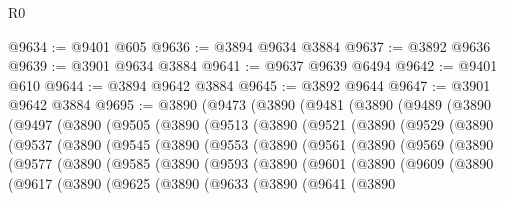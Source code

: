 \begin{lexlean}{R0}
\begin{coremodule}
@9634 := @9401 @605
@9636 := @3894 @9634 @3884
@9637 := @3892 @9636
@9639 := @3901 @9634 @3884
@9641 := @9637 @9639 @6494
@9642 := @9401 @610
@9644 := @3894 @9642 @3884
@9645 := @3892 @9644
@9647 := @3901 @9642 @3884
@9695 := @3890
    (@9473
      (@3890
        (@9481
          (@3890
            (@9489
              (@3890
                (@9497
                  (@3890
                    (@9505
                      (@3890
                        (@9513
                          (@3890
                            (@9521
                              (@3890
                                (@9529
                                  (@3890
                                    (@9537
                                      (@3890
                                        (@9545
                                          (@3890
                                            (@9553
                                              (@3890
                                                (@9561
                                                  (@3890
                                                    (@9569
                                                      (@3890
                                                        (@9577
                                                          (@3890
                                                            (@9585
                                                              (@3890
                                                                (@9593
                                                                  (@3890
                                                                    (@9601
                                                                      (@3890
                                                                        (@9609
                                                                          (@3890
                                                                            (@9617
                                                                              (@3890
                                                                                (@9625
                                                                                  (@3890
                                                                                    (@9633
                                                                                      (@3890
                                                                                        (@9641
                                                                                          (@3890

\end{coremodule}
\end{lexlean}
